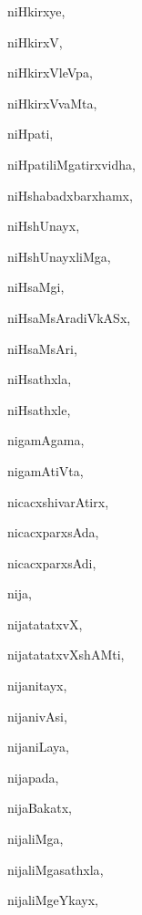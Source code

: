 \begin{multicols}{3}
{\noindent
{niHkirxye}, \pageref{niHkirxye}

\noindent
{niHkirxV}, \pageref{niHkirxV}

\noindent
{niHkirxVleVpa}, \pageref{niHkirxVleVpa}

\noindent
{niHkirxVvaMta}, \pageref{niHkirxVvaMta}

\noindent
{niHpati}, \pageref{niHpati}

\noindent
{niHpatiliMgatirxvidha}, \pageref{niHpatiliMgatirxvidha}

\noindent
{niHshabadxbarxhamx}, \pageref{niHshabadxbarxhamx}

\noindent
{niHshUnayx}, \pageref{niHshUnayx}

\noindent
{niHshUnayxliMga}, \pageref{niHshUnayxliMga}

\noindent
{niHsaMgi}, \pageref{niHsaMgi}

\noindent
{niHsaMsAradiVkASx}, \pageref{niHsaMsAradiVkASx}

\noindent
{niHsaMsAri}, \pageref{niHsaMsAri}

\noindent
{niHsathxla}, \pageref{niHsathxla}

\noindent
{niHsathxle}, \pageref{niHsathxle}

\noindent
{nigamAgama}, \pageref{nigamAgama}

\noindent
{nigamAtiVta}, \pageref{nigamAtiVta}

\noindent
{nicacxshivarAtirx}, \pageref{nicacxshivarAtirx}

\noindent
{nicacxparxsAda}, \pageref{nicacxparxsAda}

\noindent
{nicacxparxsAdi}, \pageref{nicacxparxsAdi}

\noindent
{nija}, \pageref{nija}

\noindent
{nijatatatxvX}, \pageref{nijatatatxvX}

\noindent
{nijatatatxvXshAMti}, \pageref{nijatatatxvXshAMti}

\noindent
{nijanitayx}, \pageref{nijanitayx}

\noindent
{nijanivAsi}, \pageref{nijanivAsi}

\noindent
{nijaniLaya}, \pageref{nijaniLaya}

\noindent
{nijapada}, \pageref{nijapada}

\noindent
{nijaBakatx}, \pageref{nijaBakatx}

\noindent
{nijaliMga}, \pageref{nijaliMga}

\noindent
{nijaliMgasathxla}, \pageref{nijaliMgasathxla}

\noindent
{nijaliMgeYkayx}, \pageref{nijaliMgeYkayx}

}
\end{multicols}

